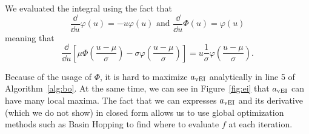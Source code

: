 We evaluated the integral using the fact that
\begin{equation*}
    \frac{ \dd }{ \dd u } \varphi(u) = - u\varphi(u)
    \text{   and   }
    \frac{ \dd }{ \dd u } \Phi(u) = \varphi(u)
\end{equation*}
meaning that
\begin{equation*}
    \frac{ \dd }{ \dd u }
    \left[
        \mu \Phi\left(\frac{ u - \mu }{ \sigma }\right) - \sigma \varphi\left(\frac{ u - \mu }{ \sigma }\right)
        \right]
    = u \frac{ 1 }{ \sigma } \varphi\left( \frac{ u - \mu }{\sigma}\right).
\end{equation*}

Because of the usage of $\Phi$, it is hard to maximize $a_{\mathrm{vEI}}$ analytically in line 5 of Algorithm~\ref{alg:bo}.
At the same time, we can see in Figure~\ref{fig:ei} that $a_{\mathrm{vEI}}$ can have many local maxima.
The fact that we can expresses $a_{\mathrm{vEI}}$ and its derivative (which we do not show) in closed form
allows us to use global optimization methods such as Basin Hopping \cite{wales1997}
to find where to evaluate $f$ at each iteration.
